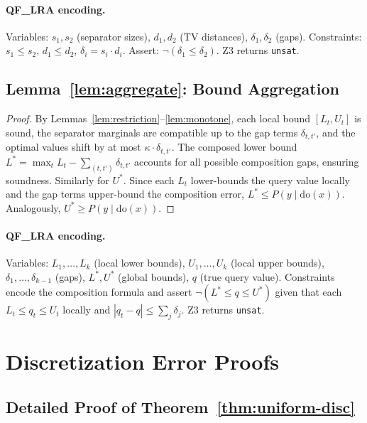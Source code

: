 \documentclass[11pt,a4paper]{article}
\newcommand{\doOp}{\mathrm{do}}
\begin{document}
\paragraph{QF\_LRA encoding.} Variables: $s_1, s_2$ (separator sizes), $d_1, d_2$ (TV distances), $\delta_1, \delta_2$ (gaps). Constraints: $s_1 \leq s_2$, $d_1 \leq d_2$, $\delta_i = s_i \cdot d_i$. Assert: $\neg(\delta_1 \leq \delta_2)$. Z3 returns \texttt{unsat}.

\subsection{Lemma~\ref{lem:aggregate}: Bound Aggregation}

\begin{proof}
By Lemmas~\ref{lem:restriction}--\ref{lem:monotone}, each local bound $[L_t, U_t]$ is sound, the separator marginals are compatible up to the gap terms $\delta_{t,t'}$, and the optimal values shift by at most $\kappa \cdot \delta_{t,t'}$. The composed lower bound $L^* = \max_t L_t - \sum_{(t,t')} \delta_{t,t'}$ accounts for all possible composition gaps, ensuring soundness. Similarly for $U^*$. Since each $L_t$ lower-bounds the query value locally and the gap terms upper-bound the composition error, $L^* \leq P(y \mid \doOp(x))$. Analogously, $U^* \geq P(y \mid \doOp(x))$.
\end{proof}

\paragraph{QF\_LRA encoding.} Variables: $L_1, \ldots, L_k$ (local lower bounds), $U_1, \ldots, U_k$ (local upper bounds), $\delta_1, \ldots, \delta_{k-1}$ (gaps), $L^*, U^*$ (global bounds), $q$ (true query value). Constraints encode the composition formula and assert $\neg(L^* \leq q \leq U^*)$ given that each $L_t \leq q_t \leq U_t$ locally and $|q_t - q| \leq \sum_j \delta_j$. Z3 returns \texttt{unsat}.

\section{Discretization Error Proofs}
\label{app:discretization}

\subsection{Detailed Proof of Theorem~\ref{thm:uniform-disc}}
\end{document}

